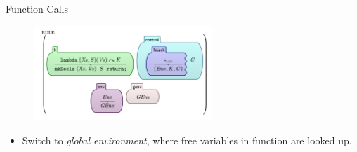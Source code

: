 \documentclass{beamer}
\begin{document}
\begin{frame}{Function Calls}
    \begin{figure}[H]
        \centering
    \includegraphics[width=0.6\textwidth]{fcall-1}
    \end{figure}
    \pause
    \begin{itemize}
        \item Switch to \textit{global environment}, where
            free variables in function are looked up.
    \end{itemize}

\end{frame}
\end{document}
